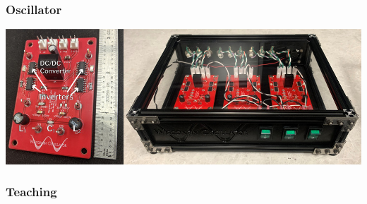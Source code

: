 \documentclass{presentation}
\begin{document}
\begin{frame}\frametitle{Oscillator}
  \includegraphics[width=\textwidth]{"./oscillator-pic.jpeg"}
\end{frame}

\begin{frame}\frametitle{Teaching}
\end{frame}
\end{document}
